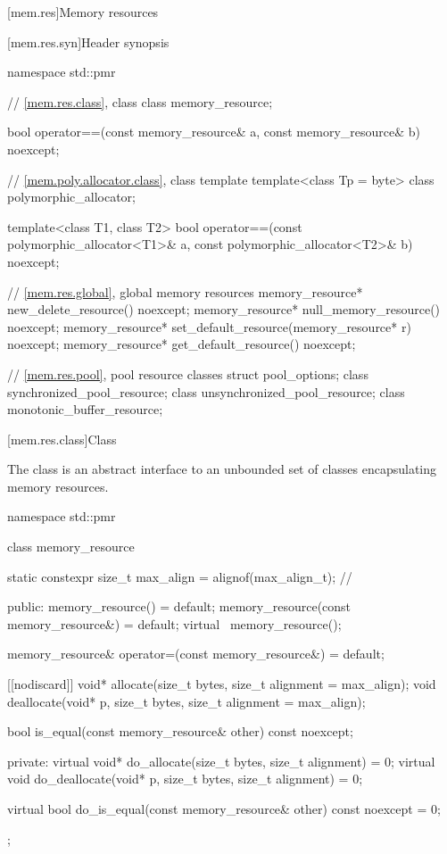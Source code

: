 [mem.res]{Memory resources}

[mem.res.syn]{Header  synopsis}

%
\begin{codeblock}
namespace std::pmr {
  // \ref{mem.res.class}, class 
  class memory_resource;

  bool operator==(const memory_resource& a, const memory_resource& b) noexcept;

  // \ref{mem.poly.allocator.class}, class template 
  template<class Tp = byte> class polymorphic_allocator;

  template<class T1, class T2>
    bool operator==(const polymorphic_allocator<T1>& a,
                    const polymorphic_allocator<T2>& b) noexcept;

  // \ref{mem.res.global}, global memory resources
  memory_resource* new_delete_resource() noexcept;
  memory_resource* null_memory_resource() noexcept;
  memory_resource* set_default_resource(memory_resource* r) noexcept;
  memory_resource* get_default_resource() noexcept;

  // \ref{mem.res.pool}, pool resource classes
  struct pool_options;
  class synchronized_pool_resource;
  class unsynchronized_pool_resource;
  class monotonic_buffer_resource;
}
\end{codeblock}

[mem.res.class]{Class }

\pnum
The  class is an abstract interface to an unbounded set of classes encapsulating memory resources.

%
%
\begin{codeblock}
namespace std::pmr {
  class memory_resource {
    static constexpr size_t max_align = alignof(max_align_t);   // \expos

  public:
    memory_resource() = default;
    memory_resource(const memory_resource&) = default;
    virtual ~memory_resource();

    memory_resource& operator=(const memory_resource&) = default;

    [[nodiscard]] void* allocate(size_t bytes, size_t alignment = max_align);
    void deallocate(void* p, size_t bytes, size_t alignment = max_align);

    bool is_equal(const memory_resource& other) const noexcept;

  private:
    virtual void* do_allocate(size_t bytes, size_t alignment) = 0;
    virtual void do_deallocate(void* p, size_t bytes, size_t alignment) = 0;

    virtual bool do_is_equal(const memory_resource& other) const noexcept = 0;
  };
}
\end{codeblock}


